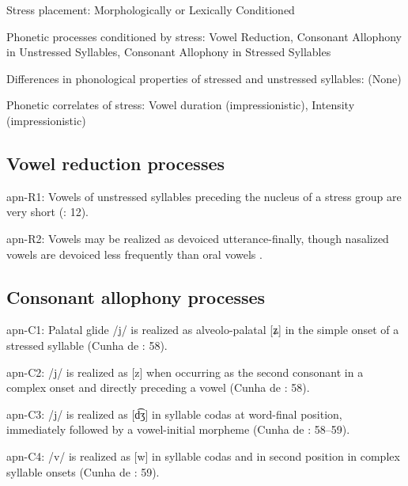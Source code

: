 {\begin{appendixdesc}
\item[Stress placement:] Morphologically or Lexically Conditioned

\item[Phonetic processes conditioned by stress:] Vowel Reduction, Consonant Allophony in Unstressed Syllables, Consonant Allophony in Stressed Syllables

\item[Differences in phonological properties of stressed and unstressed syllables:] (None)

\item[Phonetic correlates of stress:] Vowel duration (impressionistic), Intensity (impressionistic)
\end{appendixdesc}
\subsection*{Vowel reduction processes}
\begin{appendixdesc}

\item[apn-R1:] Vowels of unstressed syllables preceding the nucleus of a stress group are very short (\citealt{BurgessHam1968}: 12).

\item[apn-R2:] Vowels may be realized as devoiced utterance-finally, though nasalized vowels are devoiced less frequently than oral vowels \citep[7]{Ham2009}.
\end{appendixdesc}
\subsection*{Consonant allophony processes}
\begin{appendixdesc}

\item[apn-C1:] Palatal glide /j/ is realized as alveolo-palatal [ʑ] in the simple onset of a stressed syllable (Cunha de \citealt{Oliveira2005}: 58).

\item[apn-C2:] /j/ is realized as [z] when occurring as the second consonant in a complex onset and directly preceding a vowel (Cunha de \citealt{Oliveira2005}: 58).

\item[apn-C3:] /j/ is realized as [d͡ʒ] in syllable codas at word-final position, immediately followed by a vowel-initial morpheme (Cunha de \citealt{Oliveira2005}: 58--59).

\item[apn-C4:] /v/ is realized as [w] in syllable codas and in second position in complex syllable onsets (Cunha de \citealt{Oliveira2005}: 59).


\end{appendixdesc}}
